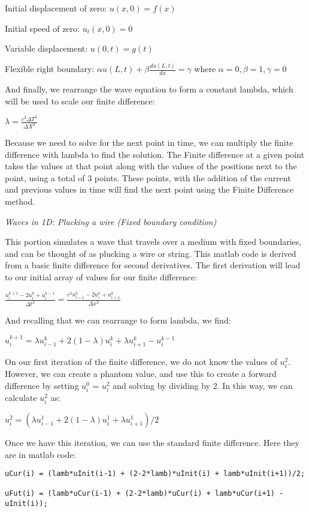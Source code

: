 \documentclass[12pt]{article}
\begin{document}
\begin{enumerate}
{\centerline{Initial displacement of zero: $u(x,0) = f(x)$}
\centerline{Initial speed of zero: $u_t(x,0) = 0$}
\centerline{Variable displacement: $u(0,t) = g(t)$}
\centerline{Flexible right boundary: $\alpha u(L,t) + \beta\frac{du(L,t)}{dx}=\gamma$ where $\alpha =0, \beta=1, \gamma = 0$ }

And finally, we rearrange the wave equation to form a constant lambda, which will be used to scale our finite difference:
\newline
\centerline{$\lambda = \frac{c^2 \Delta T^2}{\Delta X^2}$}
}
\normalsize{Because we need to solve for the next point in time, we can multiply the finite difference with lambda to find the solution. The Finite difference at a given point takes the values at that point along with the values of the positions next to the point, using a total of 3 points. These points, with the addition of the current and previous values in time will find the next point using the Finite Difference method. }

\large{\item\textit{Waves in 1D: Plucking a wire (Fixed boundary condition)}}

\normalsize{This portion simulates a wave that travels over a medium with fixed boundaries, and can be thought of as plucking a wire or string.  This matlab code is derived from a basic finite difference for second derivatives.  The first derivation will lead to our initial array of values for our finite difference:}


\centerline{$\frac{u_i^{k+1}- 2u_i^k + u_i^{k-1}}{\Delta t^2}= \frac{c^2u_{i-1}^k - 2u_i^k + u_{i+1}^k}{ \Delta x^2}$
}
And recalling that we can rearrange to form lambda, we find:

\centerline{
$u_i^{k+1} = \lambda u_{i-1}^k + 2(1-\lambda) u_i^k + \lambda u_{i+1}^k- u_i^{k-1} $
}
On our first iteration of the finite difference, we do not know the values of $u_i^2$.  However, we can create a phantom value, and use this to create a forward difference by setting $u_i^0$ = $u_i^2$ and solving by dividing by 2.  In this way, we can calculate $u_i^2$ as:

\centerline{
$u_i^2 = (\lambda u_{i-1}^1 + 2(1-\lambda) u_i^1 + \lambda u_{i+1}^1)/2$
}

Once we have this iteration, we can use the standard finite difference.  Here they are in matlab code:
\begin{verbatim}
uCur(i) = (lamb*uInit(i-1) + (2-2*lamb)*uInit(i) + lamb*uInit(i+1))/2; 

uFut(i) = (lamb*uCur(i-1) + (2-2*lamb)*uCur(i) + lamb*uCur(i+1) - uInit(i));
\end{verbatim}


\end{enumerate}
\end{document}
